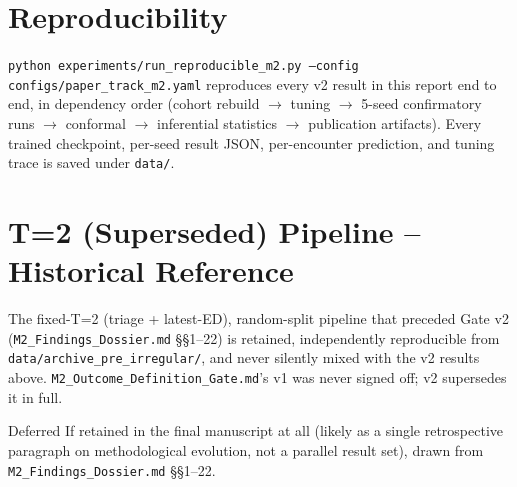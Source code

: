 \documentclass[11pt]{article}
\begin{document}
\section{Reproducibility}

\texttt{python experiments/run\_reproducible\_m2.py --config configs/paper\_track\_m2.yaml} reproduces every v2 result in this report end to end, in dependency order (cohort rebuild $\to$ tuning $\to$ 5-seed confirmatory runs $\to$ conformal $\to$ inferential statistics $\to$ publication artifacts). Every trained checkpoint, per-seed result JSON, per-encounter prediction, and tuning trace is saved under \texttt{data/}.

\section{T=2 (Superseded) Pipeline -- Historical Reference}
\label{sec:t2-legacy}

The fixed-T=2 (triage + latest-ED), random-split pipeline that preceded Gate v2 (\texttt{M2\_Findings\_Dossier.md} \S\S1--22) is retained, independently reproducible from \texttt{data/archive\_pre\_irregular/}, and never silently mixed with the v2 results above. \texttt{M2\_Outcome\_Definition\_Gate.md}'s v1 was never signed off; v2 supersedes it in full.

\begin{prosetodo}{Deferred}
If retained in the final manuscript at all (likely as a single retrospective paragraph on methodological evolution, not a parallel result set), drawn from \texttt{M2\_Findings\_Dossier.md} \S\S1--22.
\end{prosetodo}
\end{document}
